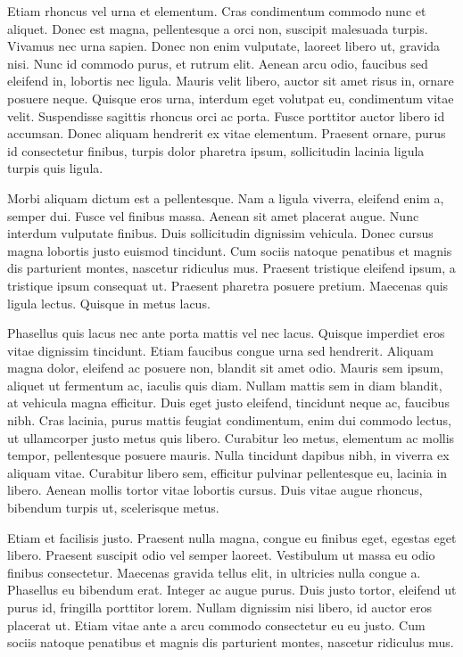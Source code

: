 \documentclass[12pt, letterpaper,twocolumn]{article}
\begin{document}
Etiam rhoncus vel urna et elementum. Cras condimentum commodo nunc et aliquet. Donec est magna, pellentesque a orci non, suscipit malesuada turpis. Vivamus nec urna sapien. Donec non enim vulputate, laoreet libero ut, gravida nisi. Nunc id commodo purus, et rutrum elit. Aenean arcu odio, faucibus sed eleifend in, lobortis nec ligula. Mauris velit libero, auctor sit amet risus in, ornare posuere neque. Quisque eros urna, interdum eget volutpat eu, condimentum vitae velit. Suspendisse sagittis rhoncus orci ac porta. Fusce porttitor auctor libero id accumsan. Donec aliquam hendrerit ex vitae elementum. Praesent ornare, purus id consectetur finibus, turpis dolor pharetra ipsum, sollicitudin lacinia ligula turpis quis ligula.

Morbi aliquam dictum est a pellentesque. Nam a ligula viverra, eleifend enim a, semper dui. Fusce vel finibus massa. Aenean sit amet placerat augue. Nunc interdum vulputate finibus. Duis sollicitudin dignissim vehicula. Donec cursus magna lobortis justo euismod tincidunt. Cum sociis natoque penatibus et magnis dis parturient montes, nascetur ridiculus mus. Praesent tristique eleifend ipsum, a tristique ipsum consequat ut. Praesent pharetra posuere pretium. Maecenas quis ligula lectus. Quisque in metus lacus.

Phasellus quis lacus nec ante porta mattis vel nec lacus. Quisque imperdiet eros vitae dignissim tincidunt. Etiam faucibus congue urna sed hendrerit. Aliquam magna dolor, eleifend ac posuere non, blandit sit amet odio. Mauris sem ipsum, aliquet ut fermentum ac, iaculis quis diam. Nullam mattis sem in diam blandit, at vehicula magna efficitur. Duis eget justo eleifend, tincidunt neque ac, faucibus nibh. Cras lacinia, purus mattis feugiat condimentum, enim dui commodo lectus, ut ullamcorper justo metus quis libero. Curabitur leo metus, elementum ac mollis tempor, pellentesque posuere mauris. Nulla tincidunt dapibus nibh, in viverra ex aliquam vitae. Curabitur libero sem, efficitur pulvinar pellentesque eu, lacinia in libero. Aenean mollis tortor vitae lobortis cursus. Duis vitae augue rhoncus, bibendum turpis ut, scelerisque metus.

Etiam et facilisis justo. Praesent nulla magna, congue eu finibus eget, egestas eget libero. Praesent suscipit odio vel semper laoreet. Vestibulum ut massa eu odio finibus consectetur. Maecenas gravida tellus elit, in ultricies nulla congue a. Phasellus eu bibendum erat. Integer ac augue purus. Duis justo tortor, eleifend ut purus id, fringilla porttitor lorem. Nullam dignissim nisi libero, id auctor eros placerat ut. Etiam vitae ante a arcu commodo consectetur eu eu justo. Cum sociis natoque penatibus et magnis dis parturient montes, nascetur ridiculus mus.
\end{document}

